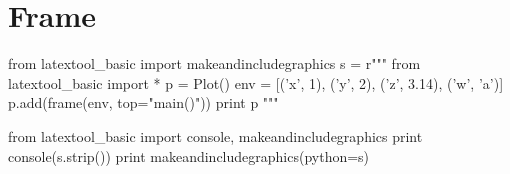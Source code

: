 \section{Frame}

\begin{python}
from latextool_basic import makeandincludegraphics
s = r"""
from latextool_basic import *
p = Plot()
env = [('x', 1), ('y', 2), ('z', 3.14), ('w', 'a')]
p.add(frame(env, top="main()"))
print p
"""

from latextool_basic import console, makeandincludegraphics
print console(s.strip())
print makeandincludegraphics(python=s)
\end{python}

